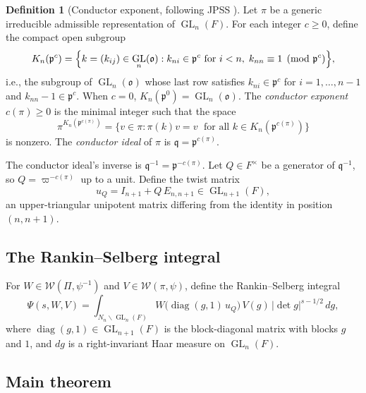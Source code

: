 \documentclass[12pt]{article}
\theoremstyle{definition}
\newtheorem{definition}[theorem]{Definition}
\DeclareMathOperator{\GL}{GL}
\DeclareMathOperator{\diag}{diag}
\begin{document}
\begin{definition}[Conductor exponent, following JPSS \cite{JPSS81}]
\label{def:conductor}
Let $\pi$ be a generic irreducible admissible representation of $\GL_n(F)$.
For each integer $c \geq 0$, define the compact open subgroup
\begin{equation}
  \label{eq:Kn}
  K_n(\mathfrak{p}^c)
  = \Bigl\{ k = (k_{ij}) \in \GL_n(\mathfrak{o}) :
    k_{ni} \in \mathfrak{p}^c \text{ for } i < n,\; k_{nn} \equiv 1 \pmod{\mathfrak{p}^c}
    \Bigr\},
\end{equation}
i.e., the subgroup of $\GL_n(\mathfrak{o})$ whose last row satisfies
$k_{ni} \in \mathfrak{p}^c$ for $i = 1,\ldots,n-1$ and $k_{nn} - 1 \in \mathfrak{p}^c$.
When $c = 0$, $K_n(\mathfrak{p}^0) = \GL_n(\mathfrak{o})$.
The \emph{conductor exponent} $c(\pi) \geq 0$ is the minimal integer such that
the space
\[
  \pi^{K_n(\mathfrak{p}^{c(\pi)})}
  = \bigl\{ v \in \pi : \pi(k)v = v \;\text{ for all } k \in K_n(\mathfrak{p}^{c(\pi)}) \bigr\}
\]
is nonzero.  The \emph{conductor ideal} of $\pi$ is $\mathfrak{q} = \mathfrak{p}^{c(\pi)}$.
\end{definition}

The conductor ideal's inverse is $\mathfrak{q}^{-1} = \mathfrak{p}^{-c(\pi)}$.
Let $Q \in F^\times$ be a generator of $\mathfrak{q}^{-1}$, so $Q = \varpi^{-c(\pi)}$
up to a unit.  Define the twist matrix
\begin{equation}
  \label{eq:uQ}
  u_Q = I_{n+1} + Q\,E_{n,n+1} \in \GL_{n+1}(F),
\end{equation}
an upper-triangular unipotent matrix differing from the identity in position $(n,n+1)$.

\subsection{The Rankin--Selberg integral}

For $W \in \mathcal{W}(\Pi,\psi^{-1})$ and $V \in \mathcal{W}(\pi,\psi)$,
define the Rankin--Selberg integral
\begin{equation}
  \label{eq:RS-integral}
  \Psi(s,W,V)
  = \int_{N_n \backslash \GL_n(F)}
    W\!\bigl(\diag(g,1)\,u_Q\bigr)\,V(g)\,|\det g|^{s-1/2}\,dg,
\end{equation}
where $\diag(g,1) \in \GL_{n+1}(F)$ is the block-diagonal matrix with blocks
$g$ and $1$, and $dg$ is a right-invariant Haar measure on $\GL_n(F)$.

\subsection{Main theorem}
\end{document}
